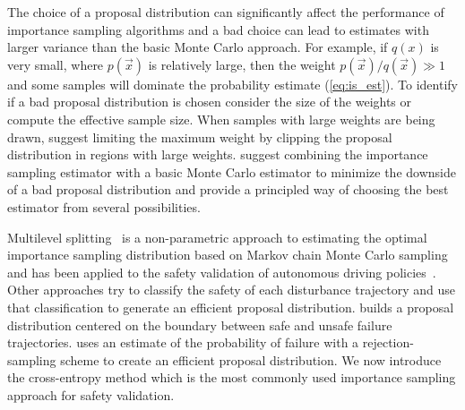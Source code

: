 The choice of a proposal distribution can significantly affect the performance of importance sampling algorithms and a bad choice can lead to estimates with larger variance than the basic Monte Carlo approach. For example, if $q(x)$ is very small, where $p(\vec{x})$ is relatively large, then the weight $p(\vec{x})/q(\vec{x}) \gg 1$ and some samples will dominate the probability estimate (\cref{eq:is_est}). To identify if a bad proposal distribution is chosen consider the size of the weights or compute the effective sample size. When samples with large weights are being drawn, \textcite{kim2016improving} suggest limiting the maximum weight by clipping the proposal distribution in regions with large weights. \textcite{uesato2019rigorous} suggest combining the importance sampling estimator with a basic Monte Carlo estimator to minimize the downside of a bad proposal distribution and \textcite{neufeld2014adaptive} provide a principled way of choosing the best estimator from several possibilities. 


Multilevel splitting~\cite{kahn1951estimation} is a non-parametric approach to estimating the optimal importance sampling distribution based on Markov chain Monte Carlo sampling and has been applied to the safety validation of autonomous driving policies~\cite{norden2019efficient}. Other approaches try to classify the safety of each disturbance trajectory and use that classification to generate an efficient proposal distribution. \textcite{huang2018versatile} builds a proposal distribution centered on the boundary between safe and unsafe failure trajectories. \textcite{uesato2019rigorous} uses an estimate of the probability of failure with a rejection-sampling scheme to create an efficient proposal distribution. We now introduce the cross-entropy method which is the most commonly used importance sampling approach for safety validation. 

